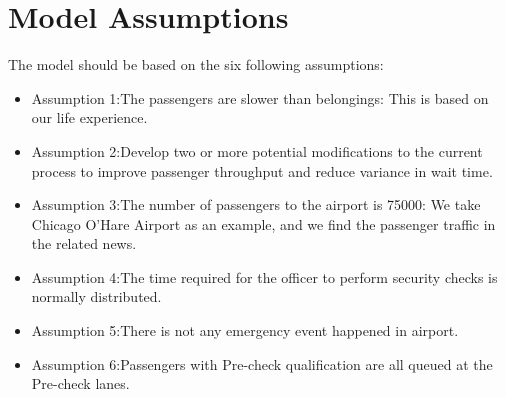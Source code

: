 
\section{Model Assumptions}
The model should be based on the six following assumptions:
\begin{itemize}
  \item Assumption 1:The passengers are slower than belongings: This is based on our life experience.
  \item Assumption 2:Develop two or more potential modifications to the current process to improve passenger throughput and reduce variance in wait time.
  \item Assumption 3:The number of passengers to the airport is 75000: We take Chicago O'Hare Airport as an example, and we find the passenger traffic in the related news.
  \item Assumption 4:The time required for the officer to perform security checks is normally distributed.
  \item Assumption 5:There is not any emergency event happened in airport.
  \item Assumption 6:Passengers with Pre-check qualification are all queued at the Pre-check lanes.
\end{itemize}
